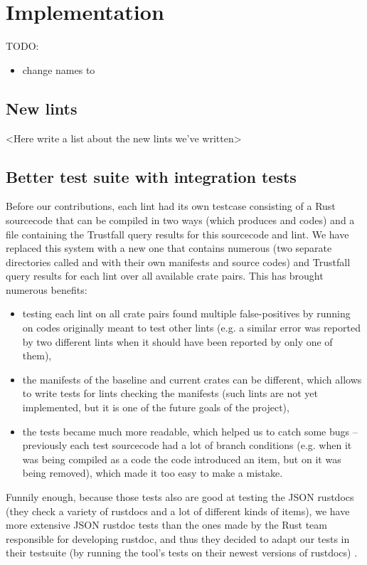 \documentclass[licencjacka,en]{pracamgr}
\begin{document}

\chapter{Implementation}\label{r:chapter_implementation}

TODO:
\begin{itemize}
	\item change names to 
\end{itemize}

\section{New lints}\label{r:section_new_lints}

<Here write a list about the new lints we've written>

\section{Better test suite with integration tests}\label{r:section_test_suite}

Before our contributions, each lint had its own testcase consisting of
a Rust sourcecode that can be compiled in two ways (which produces
 and  codes) and a file containing the Trustfall query results
for this sourcecode and lint.
We have replaced this system with a new one that contains numerous 
(two separate directories called  and  with their own
manifests and source codes) and Trustfall query results for each lint over all
available crate pairs. This has brought numerous benefits:
\begin{itemize}
	\item testing each lint on all crate pairs found multiple false-positives by running
		on codes originally meant to test other lints
		(e.g. a similar error was reported by two different lints
		when it should have been reported by only one of them),
	\item the manifests of the baseline and current crates can be different,
		which allows to write tests for lints checking the manifests
		(such lints are not yet implemented, but it is one of the future goals
		of the project),
	\item the tests became much more readable, which helped us to catch some bugs
		-- previously each test sourcecode had a lot of branch conditions
		(e.g. when it was being compiled as a  code
		the code introduced an item, but on  it was being removed),
		which made it too easy to make a mistake.
\end{itemize}
Funnily enough, because those tests also are good at testing the JSON rustdocs
(they check a variety of rustdocs and a lot of different kinds of items),
we have more extensive JSON rustdoc tests than the ones made by the
Rust team responsible for developing rustdoc,
and thus they decided to adapt our tests in their testsuite
(by running the tool's tests on their newest versions of rustdocs) \cite{issue-rustdoc-our-tests}.
\end{document}
